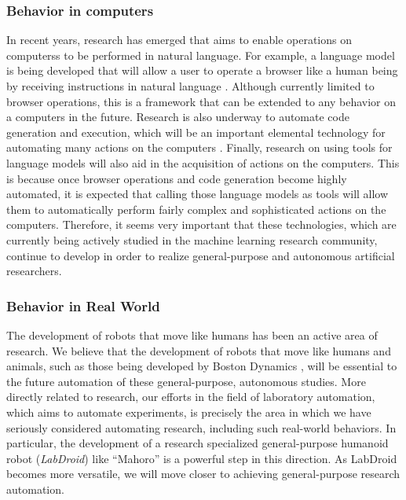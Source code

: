 \documentclass{book}
\begin{document}
\subsubsection{Behavior in computers}
In recent years, research has emerged that aims to enable operations on computerss to be performed in natural language. For example, a language model is being developed that will allow a user to operate a browser like a human being by receiving instructions in natural language \cite{nakano2021webgpt}. Although currently limited to browser operations, this is a framework that can be extended to any behavior on a computers in the future. Research is also underway to automate code generation and execution, which will be an important elemental technology for automating many actions on the computers \cite{gulwani2017program}. Finally, research on using tools for language models \cite{mialon2023augmented} will also aid in the acquisition of actions on the computers. This is because once browser operations and code generation become highly automated, it is expected that calling those language models as tools will allow them to automatically perform fairly complex and sophisticated actions on the computers. Therefore, it seems very important that these technologies, which are currently being actively studied in the machine learning research community, continue to develop in order to realize general-purpose and autonomous artificial researchers.

\subsubsection{Behavior in Real World}
The development of robots that move like humans has been an active area of research. We believe that the development of robots that move like humans and animals, such as those being developed by Boston Dynamics \cite{kuindersma2016optimization}, will be essential to the future automation of these general-purpose, autonomous studies. More directly related to research, our efforts in the field of laboratory automation, which aims to automate experiments, is precisely the area in which we have seriously considered automating research, including such real-world behaviors. In particular, the development of a research specialized general-purpose humanoid robot (\textit{LabDroid}) like ``Mahoro'' \cite{yachie2017robotic} is a powerful step in this direction. As LabDroid becomes more versatile, we will move closer to achieving general-purpose research automation.
\end{document}
